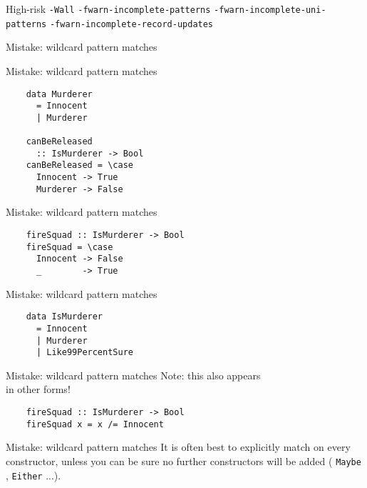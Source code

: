 \documentclass[20pt]{beamer}
\newcommand{\vspaced}{
    \vspace{5mm}
}
\newcommand{\chapterslide}[1]{
    {
        \begin{frame}[plain]
        \begin{center}
        \large{#1}
        \end{center}
        \end{frame}
    }
}
\newcommand{\code}[1]{
    \texttt{\small{#1}}
}
\begin{document}
\begin{frame}{High-risk \code{-Wall}}
    \small{
    \texttt{-fwarn-incomplete-patterns}
    \texttt{-fwarn-incomplete-uni-patterns}
    \texttt{-fwarn-incomplete-record-updates}
    }
\end{frame}


\chapterslide{Mistake: wildcard pattern matches}

\begin{frame}[fragile]{Mistake: wildcard pattern matches}
    \begin{lstlisting}
    data Murderer
      = Innocent
      | Murderer

    canBeReleased
      :: IsMurderer -> Bool
    canBeReleased = \case
      Innocent -> True
      Murderer -> False
    \end{lstlisting}
\end{frame}

\begin{frame}[fragile]{Mistake: wildcard pattern matches}
    \begin{lstlisting}
    fireSquad :: IsMurderer -> Bool
    fireSquad = \case
      Innocent -> False
      _        -> True
    \end{lstlisting}
\end{frame}

\begin{frame}[fragile]{Mistake: wildcard pattern matches}
    \begin{lstlisting}
    data IsMurderer
      = Innocent
      | Murderer
      | Like99PercentSure
    \end{lstlisting}
\end{frame}

\begin{frame}[fragile]{Mistake: wildcard pattern matches}
    Note: this also appears \\
    in other forms!
    \vspaced
    \begin{lstlisting}
    fireSquad :: IsMurderer -> Bool
    fireSquad x = x /= Innocent
    \end{lstlisting}
\end{frame}

\begin{frame}{Mistake: wildcard pattern matches}
    It is often best to explicitly match on every constructor, unless you can be
    sure no further constructors will be added (\code{Maybe}, \code{Either}...).
\end{frame}
\end{document}
